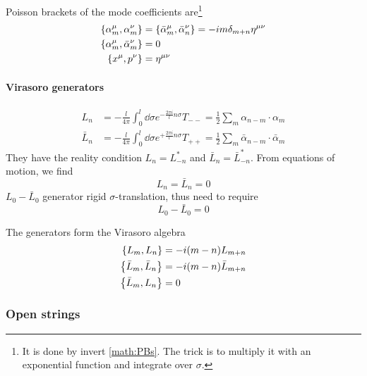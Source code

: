 \documentclass[12pt, a4paper, DIV=15]{article}
\numberwithin{equation}{section}
\begin{document}
Poisson brackets of the mode coefficients are\footnote{It is done by invert \eqref{math:PBs}. The trick is to multiply it with an exponential function and integrate over $\sigma$.}
\begin{subequations}
\begin{align}
	\acomm{\alpha^\mu_m}{\alpha^\nu_m} &= \acomm{\bar{\alpha}^\mu_m}{\bar{\alpha}^\nu_n} = -im \delta_{m+n} \eta^{\mu\nu} \\
	\acomm{\alpha^\mu_m}{\bar{\alpha}^\nu_m} &= 0 \\
	\acomm{x^\mu}{p^\nu} &= \eta^{\mu\nu}
\end{align}	\label{math:PBs-alpha}
\end{subequations}

\paragraph{Virasoro generators}
\begin{subequations}
\begin{align}
	L_n &= - \frac{l}{4\pi} \int_0^l \dd{\sigma} e^{- \frac{2\pi i}{l}n\sigma} T_{--} = \frac{1}{2} \sum_{m} \alpha_{n-m} \cdot \alpha_m \\
	\bar{L}_n &= - \frac{l}{4\pi} \int_0^l \dd{\sigma} e^{+ \frac{2\pi i}{l}n\sigma} T_{++}= \frac{1}{2} \sum_{m} \bar\alpha_{n-m} \cdot \bar\alpha_m 
\end{align}
\label{math:Vira}
\end{subequations}
They have the reality condition $L_n = L_{-n}^*$ and $\bar{L}_n = \bar{L}_{-n}^*$. From equations of motion, we find 
\begin{equation}
	L_n = \bar{L}_n = 0
	\label{math:class-constr}
\end{equation}
$L_0 - \bar{L}_0$ generator rigid $\sigma$-translation, thus need to require
\begin{equation}
	L_0 - \bar{L}_0 = 0
\end{equation}

The generators form the Virasoro algebra
\begin{subequations}
\begin{align}
	\acomm{L_m}{L_n} &= -i (m-n) L_{m+n} \\
	\acomm{\bar{L}_m}{\bar{L}_n} &= -i(m-n) \bar{L}_{m+n} \\
	\acomm{\bar{L}_m}{L_{n}} &= 0
\end{align}
\end{subequations}

\subsubsection{Open strings}
\end{document}
